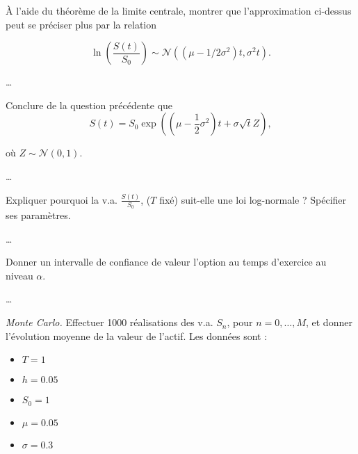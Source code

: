 \documentclass[answers, 10pt]{exam}
\begin{document}
\begin{questions}
	\question
	\`A l'aide du théorème de la limite centrale, montrer que l'approximation ci-dessus peut se préciser plus par la relation

		\begin{equation*}
			\ln \left( \frac{S(t)}{S_0} \right) \sim \mathcal{N} \left(  \left(  \mu - 1/2 \sigma^2 \right)t, \sigma^2 t \right).
		\end{equation*}
	
	\begin{solutionorbox}
		\dots
	\end{solutionorbox}

	\question
	Conclure de la question précédente que
	\begin{equation*}
		S(t) = S_0 \exp \left(  \left(  \mu - \frac{1}{2}\sigma^2 \right)t + \sigma \sqrt{
		t}Z \right),
	\end{equation*}

	où $Z\sim \mathcal{N}(0, 1)$.
	
	\begin{solutionorbox}
		\dots
	\end{solutionorbox}

	\question
	Expliquer pourquoi la v.a. $\frac{S(t)}{S_0}$, ($T$ fixé) suit-elle une
	loi log-normale ? Spécifier ses paramètres.
	
	\begin{solutionorbox}
		\dots
	\end{solutionorbox}

	\question
	Donner un intervalle de confiance de valeur l'option au temps
	d'exercice au niveau $\alpha$.

	\begin{solutionorbox}
		\dots
	\end{solutionorbox}

	\question
	
	\textit{Monte Carlo.} Effectuer 1000 réalisations des v.a. $S_n$, pour
	$n=0,\dots,M$, et donner l'évolution moyenne de la valeur de l'actif.
	Les données sont : 
	
	\begin{itemize}
		\item $T=1$
		\item $h = 0.05$
		\item $S_0 = 1$
		\item $\mu = 0.05$
		\item $ \sigma = 0.3$
	\end{itemize}

\end{questions}
\end{document}
